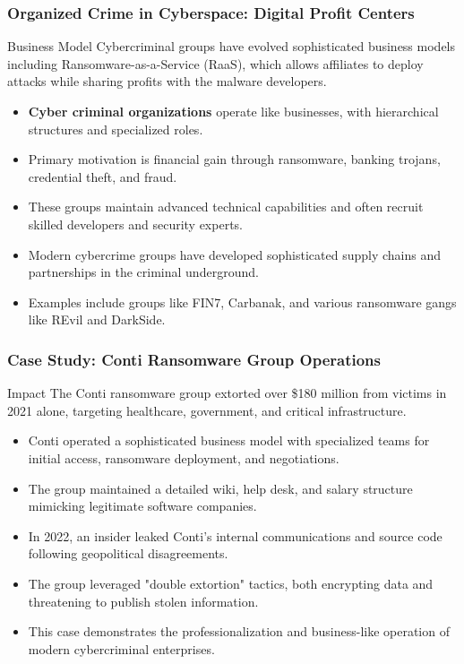 \documentclass{beamer}
\begin{document}
\begin{frame}
    \frametitle{Organized Crime in Cyberspace: Digital Profit Centers}
    
    \begin{block}{Business Model}
        Cybercriminal groups have evolved sophisticated business models including Ransomware-as-a-Service (RaaS), which allows affiliates to deploy attacks while sharing profits with the malware developers.
    \end{block}
    
    \begin{itemize}
        \item \textbf{Cyber criminal organizations} operate like businesses, with hierarchical structures and specialized roles.
        \item Primary motivation is financial gain through ransomware, banking trojans, credential theft, and fraud.
        \item These groups maintain advanced technical capabilities and often recruit skilled developers and security experts.
        \item Modern cybercrime groups have developed sophisticated supply chains and partnerships in the criminal underground.
        \item Examples include groups like FIN7, Carbanak, and various ransomware gangs like REvil and DarkSide.
    \end{itemize}
\end{frame}

\begin{frame}
    \frametitle{Case Study: Conti Ransomware Group Operations}
    
    \begin{alertblock}{Impact}
        The Conti ransomware group extorted over \$180 million from victims in 2021 alone, targeting healthcare, government, and critical infrastructure.
    \end{alertblock}
    
    \begin{itemize}
        \item Conti operated a sophisticated business model with specialized teams for initial access, ransomware deployment, and negotiations.
        \item The group maintained a detailed wiki, help desk, and salary structure mimicking legitimate software companies.
        \item In 2022, an insider leaked Conti's internal communications and source code following geopolitical disagreements.
        \item The group leveraged "double extortion" tactics, both encrypting data and threatening to publish stolen information.
        \item This case demonstrates the professionalization and business-like operation of modern cybercriminal enterprises.
    \end{itemize}
\end{frame}
\end{document}
